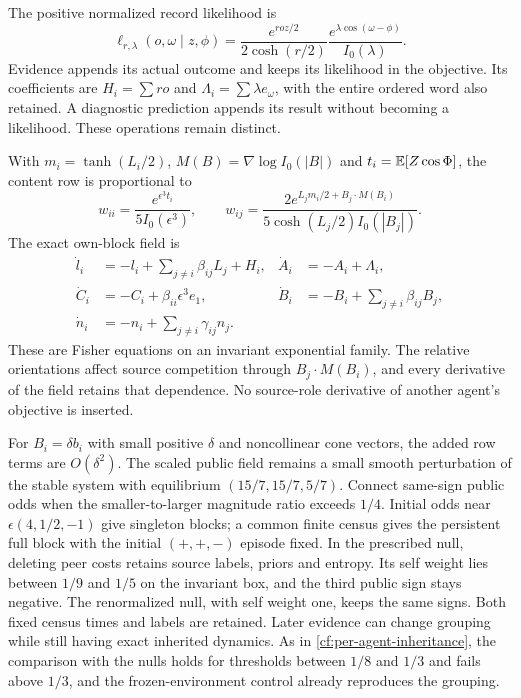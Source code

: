 The positive normalized record likelihood is
\begin{equation}
 \ell_{r,\lambda}(o,\omega\mid z,\phi)
 =\frac{e^{ro z/2}}{2\cosh(r/2)}
 \frac{e^{\lambda\cos(\omega-\phi)}}{I_0(\lambda)}.
 \label{clp:record}
\end{equation}
Evidence appends its actual outcome and keeps its likelihood in the objective. Its coefficients are $H_i=\sum ro$ and $\Lambda_i=\sum\lambda e_\omega$, with the entire ordered word also retained. A diagnostic prediction appends its result without becoming a likelihood. These operations remain distinct.

With $m_i=\tanh(L_i/2)$, $M(B)=\nabla\log I_0(|B|)$ and $t_i=\mathbb E[Z\cos\Phi]$, the content row is proportional to
\begin{equation}
 w_{ii}=\frac{e^{\epsilon^3t_i}}{5I_0(\epsilon^3)},\qquad
 w_{ij}=\frac{2e^{L_jm_i/2+B_j\cdot M(B_i)}}
 {5\cosh(L_j/2)I_0(|B_j|)}.
 \label{clp:row}
\end{equation}
The exact own-block field is
\begin{equation}
 \begin{aligned}
 \dot l_i&=-l_i+\sum_{j\ne i}\beta_{ij}L_j+H_i,&
 \dot A_i&=-A_i+\Lambda_i,\\
 \dot C_i&=-C_i+\beta_{ii}\epsilon^3e_1,&
 \dot B_i&=-B_i+\sum_{j\ne i}\beta_{ij}B_j,\\
 \dot n_i&=-n_i+\sum_{j\ne i}\gamma_{ij}n_j.
 \end{aligned}
 \label{clp:field}
\end{equation}
These are Fisher equations on an invariant exponential family. The relative orientations affect source competition through $B_j\cdot M(B_i)$, and every derivative of the field retains that dependence. No source-role derivative of another agent's objective is inserted.

For $B_i=\delta b_i$ with small positive $\delta$ and noncollinear cone vectors, the added row terms are $O(\delta^2)$. The scaled public field remains a small smooth perturbation of the stable system with equilibrium $(15/7,15/7,5/7)$. Connect same-sign public odds when the smaller-to-larger magnitude ratio exceeds $1/4$. Initial odds near $\epsilon(4,1/2,-1)$ give singleton blocks; a common finite census gives the persistent full block with the initial $(+,+,-)$ episode fixed. In the prescribed null, deleting peer costs retains source labels, priors and entropy. Its self weight lies between $1/9$ and $1/5$ on the invariant box, and the third public sign stays negative. The renormalized null, with self weight one, keeps the same signs. Both fixed census times and labels are retained. Later evidence can change grouping while still having exact inherited dynamics. As in \cref{cf:per-agent-inheritance}, the comparison with the nulls holds for thresholds between $1/8$ and $1/3$ and fails above $1/3$, and the frozen-environment control already reproduces the grouping.

